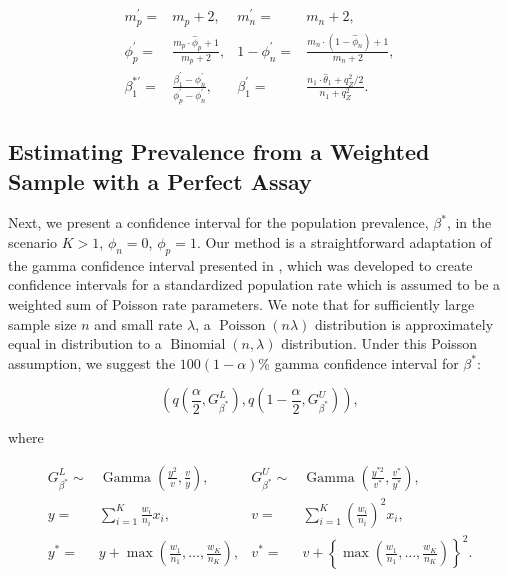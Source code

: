 \begin{align*}
    m_p^\prime =& m_p +2, &
    m_n^\prime =& m_n + 2, \\
    \phi_p^\prime =& \frac{m_p \cdot \hat{\phi}_p + 1}{m_p + 2}, &
   1 - \phi_n^\prime =& \frac{m_n \cdot (1 - \hat{\phi}_n) + 1}{m_n + 2}, \\
   \beta_1^{*\prime} =& \frac{\beta_1^\prime - \phi_n^\prime}{\phi_p^\prime - \phi_n^\prime}, &
    \beta_1^\prime =& \frac{n_1 \cdot \hat{\theta}_1 + q_Z^2 / 2}{n_1 + q_Z^2}.
\end{align*}

\subsection{Estimating Prevalence from a Weighted Sample with a Perfect Assay}
\label{ch_3:sec:weight-perfect}

Next, we present a confidence interval for the population prevalence, \( \beta^* \), in the scenario \( K > 1 \), \( \phi_n = 0 \), \( \phi_p = 1 \).
Our method is a straightforward adaptation of the gamma confidence interval presented in \citep{FayF:1997}, which was developed to create confidence intervals for a standardized population rate which is assumed to be a weighted sum of Poisson rate parameters.
We note that for sufficiently large sample size \( n \) and small rate \( \lambda \), a \( \operatorname{Poisson}(n\lambda) \) distribution is approximately equal in distribution to a \( \operatorname{Binomial}(n, \lambda) \) distribution.
Under this Poisson assumption, we suggest the \( 100(1 - \alpha) \)\% gamma confidence interval for \( \beta^* \):

\begin{equation}
    \left( q\left( \frac{\alpha}{2}, G_{\beta^*}^L \right), q \left( 1 - \frac{\alpha}{2}, G_{\beta^*}^U \right) \right),
\end{equation}


where

\begin{align*}
    G_{\beta^*}^L \sim& \operatorname{Gamma}\left( \frac{y^2}{v}, \frac{v}{y} \right), &
    G_{\beta^*}^U \sim& \operatorname{Gamma}\left( \frac{y^{*2}}{v^*}, \frac{v^*}{y^*} \right), \\
    y =& \sum_{i=1}^K \frac{w_i}{n_i} x_i, &
    v =& \sum_{i=1}^K \left( \frac{w_i}{n_i}\right)^2 x_i, \\
    y^* =& y + \max\left(\frac{w_1}{n_1}, \ldots, \frac{w_K}{n_K} \right), &
    v^* =& v + \left\{ \max\left(\frac{w_1}{n_1}, \ldots, \frac{w_K}{n_K} \right) \right\}^2.
\end{align*}

